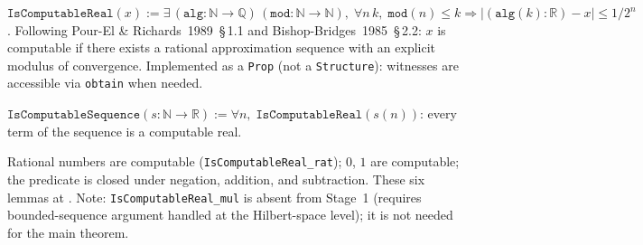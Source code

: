 \begin{definition}
\label{def:IsComputableReal}
\leanok
$\texttt{IsComputableReal}(x) := \exists\, (\texttt{alg} : \mathbb{N}
\to \mathbb{Q})\, (\texttt{mod} : \mathbb{N} \to \mathbb{N}),\;
\forall n\, k,\; \texttt{mod}(n) \le k \Rightarrow
|(\texttt{alg}(k) : \mathbb{R}) - x| \le 1/2^n$.
Following Pour-El \& Richards~1989~§\,1.1 and Bishop-Bridges~1985~§\,2.2:
$x$ is computable if there exists a rational approximation sequence with
an explicit modulus of convergence.  Implemented as a \texttt{Prop}
(not a \texttt{Structure}): witnesses are accessible via \texttt{obtain}
when needed.
\end{definition}

\begin{definition}
\label{def:IsComputableSequence}
\leanok
{}
$\texttt{IsComputableSequence}(s : \mathbb{N} \to \mathbb{R}) :=
\forall n,\; \texttt{IsComputableReal}(s(n))$: every term of the
sequence is a computable real.
\end{definition}

\begin{theorem}
\label{thm:IsComputableReal_lemmas}
\leanok
{}
Rational numbers are computable (\texttt{IsComputableReal\_rat});
$0$, $1$ are computable; the predicate is closed under negation,
addition, and subtraction.  These six lemmas at
.
Note: \texttt{IsComputableReal\_mul} is absent from Stage~1 (requires
bounded-sequence argument handled at the Hilbert-space level); it is
not needed for the main theorem.
\end{theorem}

